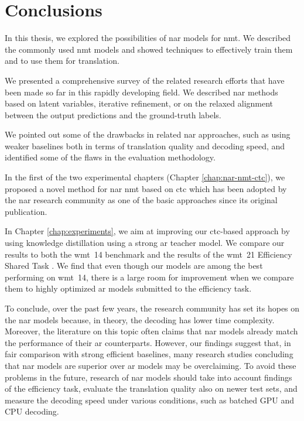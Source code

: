 \chapter{Conclusions}


In this thesis, we explored the possibilities of \ac{nar} models for
\ac{nmt}. We described the commonly used \ac{nmt} models and showed techniques
to effectively train them and to use them for translation.

We presented a comprehensive survey of the related research efforts that have
been made so far in this rapidly developing field. We described \ac{nar}
methods based on latent variables, iterative refinement, or on the relaxed
alignment between the output predictions and the ground-truth labels.

We pointed out some of the drawbacks in related \ac{nar} approaches, such as
using weaker baselines both in terms of translation quality and decoding speed,
and identified some of the flaws in the evaluation methodology.

In the first of the two experimental chapters (Chapter \ref{chap:nar-nmt-ctc}),
we proposed a novel method for \ac{nar} \ac{nmt} based on \ac{ctc} which has
been adopted by the \ac{nar} research community as one of the basic approaches
since its original publication.

In Chapter \ref{chap:experiments}, we aim at improving our \acs{ctc}-based
approach by using knowledge distillation using a strong \ac{ar} teacher model.
We compare our results to both the \acs{wmt}~14 benchmark and the results of
the \acs{wmt}~21 Efficiency Shared Task \citep{heafield-etal-2021-findings}. We
find that even though our models are among the best performing on \acs{wmt}~14,
there is a large room for improvement when we compare them to highly optimized
\acl{ar} models submitted to the efficiency task.

To conclude, over the past few years, the research community has set its hopes
on the \ac{nar} models because, in theory, the decoding has lower time
complexity. Moreover, the literature on this topic often claims that \ac{nar}
models already match the performance of their \ac{ar} counterparts. However,
our findings suggest that, in fair comparison with strong efficient baselines,
many research studies concluding that \ac{nar} models are superior over \ac{ar}
models may be overclaiming. To avoid these problems in the future, research of
\ac{nar} models should take into account findings of the efficiency task,
evaluate the translation quality also on newer test sets, and measure the
decoding speed under various conditions, such as batched GPU and CPU decoding.



